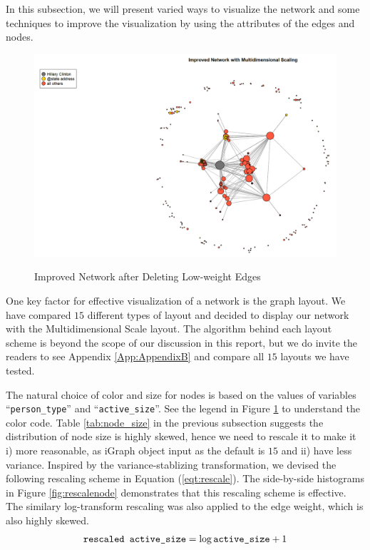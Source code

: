 In this subsection, we will present varied ways to visualize the network and some techniques to improve the visualization by using the attributes of the edges and nodes.

\begin{figure}[ht]
\centering
\includegraphics[width = 1\textwidth]{zoe/report_dms_layout}
\label{fig:improvednw}
\caption{Improved Network after Deleting Low-weight Edges}
\end{figure}

One key factor for effective visualization of a network is the graph layout. We have compared $15$ different types of layout and decided to display our network with the Multidimensional Scale layout. The algorithm behind each layout scheme is beyond the scope of our discussion in this report, but we do invite the readers to see Appendix \ref{App:AppendixB}  and compare all $15$ layouts we have tested.

The natural choice of color and size for nodes is based on the values of variables ``\verb+person_type+'' and ``\verb+active_size+''. See the legend in Figure \ref{fig:improvednw} to understand the color code. Table \ref{tab:node_size} in the previous subsection suggests the distribution of node size is highly skewed, hence we need to rescale it to make it i) more reasonable, as iGraph object input as the default is $15$ and ii) have less variance. Inspired by the variance-stablizing transformation, we devised the following rescaling scheme in Equation (\ref{eqt:rescale}). The side-by-side histograms in Figure \ref{fig:rescalenode} demonstrates that this rescaling scheme is effective. The similary log-transform rescaling was also applied to the edge weight, which is also highly skewed.
\begin{equation}
\label{eqt:rescale}
\verb+rescaled active_size+ = \log \verb+active_size+ + 1
\end{equation}

